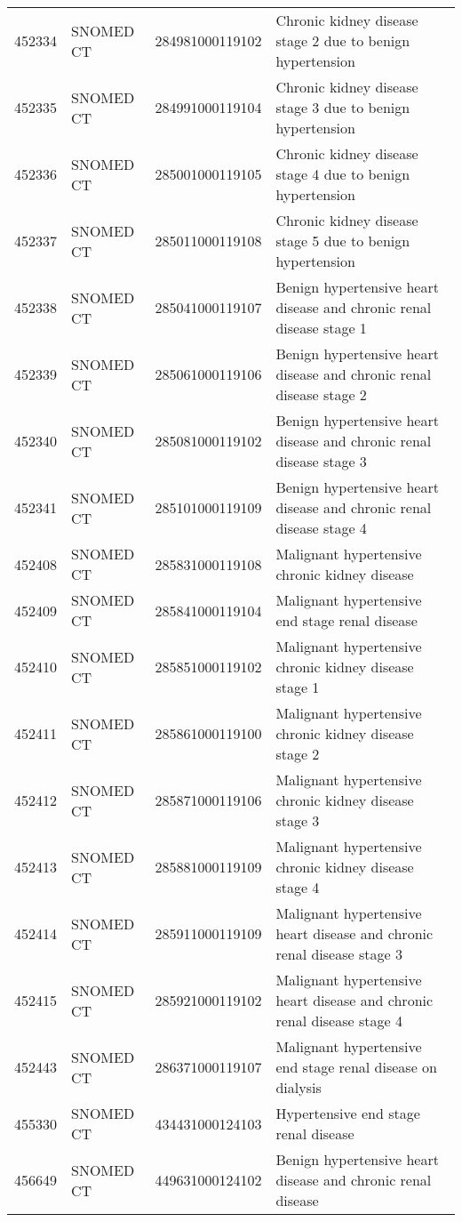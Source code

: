 \begin{table}[ht]
\begin{tabular}{rlll}
  452334 & SNOMED CT & 284981000119102 & Chronic kidney disease stage 2 due to benign hypertension \\ 
  452335 & SNOMED CT & 284991000119104 & Chronic kidney disease stage 3 due to benign hypertension \\ 
  452336 & SNOMED CT & 285001000119105 & Chronic kidney disease stage 4 due to benign hypertension \\ 
  452337 & SNOMED CT & 285011000119108 & Chronic kidney disease stage 5 due to benign hypertension \\ 
  452338 & SNOMED CT & 285041000119107 & Benign hypertensive heart disease and chronic renal disease stage 1 \\ 
  452339 & SNOMED CT & 285061000119106 & Benign hypertensive heart disease and chronic renal disease stage 2 \\ 
  452340 & SNOMED CT & 285081000119102 & Benign hypertensive heart disease and chronic renal disease stage 3 \\ 
  452341 & SNOMED CT & 285101000119109 & Benign hypertensive heart disease and chronic renal disease stage 4 \\ 
  452408 & SNOMED CT & 285831000119108 & Malignant hypertensive chronic kidney disease \\ 
  452409 & SNOMED CT & 285841000119104 & Malignant hypertensive end stage renal disease \\ 
  452410 & SNOMED CT & 285851000119102 & Malignant hypertensive chronic kidney disease stage 1 \\ 
  452411 & SNOMED CT & 285861000119100 & Malignant hypertensive chronic kidney disease stage 2 \\ 
  452412 & SNOMED CT & 285871000119106 & Malignant hypertensive chronic kidney disease stage 3 \\ 
  452413 & SNOMED CT & 285881000119109 & Malignant hypertensive chronic kidney disease stage 4 \\ 
  452414 & SNOMED CT & 285911000119109 & Malignant hypertensive heart disease and chronic renal disease stage 3 \\ 
  452415 & SNOMED CT & 285921000119102 & Malignant hypertensive heart disease and chronic renal disease stage 4 \\ 
  452443 & SNOMED CT & 286371000119107 & Malignant hypertensive end stage renal disease on dialysis \\ 
  455330 & SNOMED CT & 434431000124103 & Hypertensive end stage renal disease \\ 
  456649 & SNOMED CT & 449631000124102 & Benign hypertensive heart disease and chronic renal disease \\ 

\end{tabular}
\end{table}
